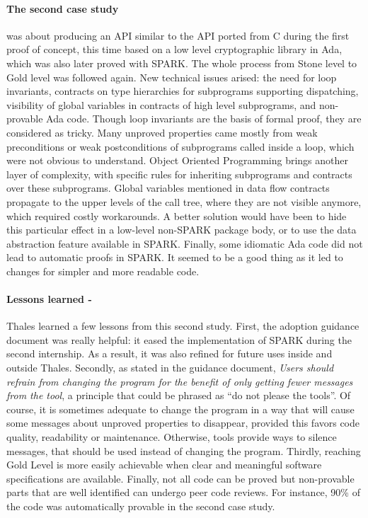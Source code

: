 \documentclass{llncs}
\begin{document}
\paragraph{The second case study} was about producing an API similar to the API ported from C
during the first proof of concept, this time based on a low level cryptographic
library in Ada, which was also later proved with SPARK. The whole process from
Stone level to Gold level was followed again. New technical
issues arised: the need for loop invariants, contracts on type hierarchies for
subprograms supporting dispatching, visibility of global variables in contracts
of high level subprograms, and non-provable Ada code. Though loop invariants are
the basis of formal proof, they are considered as tricky. Many unproved
properties came mostly from weak preconditions or weak postconditions of
subprograms called inside a loop, which were not obvious to understand. Object
Oriented Programming brings another layer of complexity, with specific rules
for inheriting subprograms and contracts over these subprograms. Global
variables mentioned in data flow contracts propagate to the upper levels of the
call tree, where they are not visible anymore, which required costly
workarounds. A better solution would have been to hide this particular effect
in a low-level non-SPARK package body, or to use the data abstraction feature
available in SPARK. Finally, some idiomatic Ada code did not lead to automatic
proofs in SPARK. It seemed to be a good thing as it led to changes for
simpler and more readable code.

\paragraph{Lessons learned -}
Thales learned a few lessons from this second study. First, the adoption
guidance document was really helpful: it eased the implementation of SPARK
during the second internship. As a result, it was also refined for future uses
inside and outside Thales. Secondly, as stated in the guidance document,
\textit{Users should refrain from changing the program for the benefit of only
  getting fewer messages from the tool}, a principle that could be phrased as
``do not please the tools''. Of course, it is sometimes adequate to change the
program in a way that will cause some messages about unproved properties to
disappear, provided this favors code quality, readability or
maintenance. Otherwise, tools provide ways to silence messages, that should be
used instead of changing the program.  Thirdly, reaching Gold Level is more
easily achievable when clear and meaningful software specifications are
available. Finally, not all code can be proved but non-provable parts that are
well identified can undergo peer code reviews. For instance, 90\% of the code
was automatically provable in the second case study.
\end{document}
